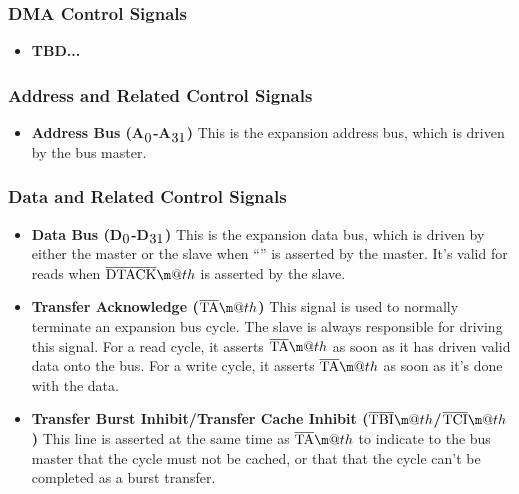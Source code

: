 \documentclass{article}
\makeatletter
\newcommand*{\textoverline}[1]{$\overline{\hbox{#1}}\m@th$}
\newcommand{\textss}[1]{$_{\hbox{#1}}$}
\makeatother
\begin{document}
\subsubsection{DMA Control Signals}

\begin{itemize}
	\item{\textbf{TBD...}}
\end{itemize}

\subsubsection{Address and Related Control Signals}

\begin{itemize}

	\item{\textbf{Address Bus (A\textss{0}-A\textss{31})}} This is the
	expansion address bus, which is driven by the bus master.

\end{itemize}

\subsubsection{Data and Related Control Signals}

\begin{itemize}
	\item{\textbf{Data Bus (D\textss{0}-D\textss{31})}} This is the
	expansion data bus, which is driven by either the master or the slave
	when ``'' is asserted by the master. It's valid for reads when
	\textoverline{DTACK} is asserted by the slave.

	\item{\textbf{Transfer Acknowledge (\textoverline{TA})}} This
	signal is used to normally terminate an expansion bus cycle. The slave
	is always responsible for driving this signal. For a read cycle, it
	asserts \textoverline{TA} as soon as it has driven valid data onto
	the bus. For a write cycle, it asserts \textoverline{TA} as soon as
	it's done with the data.

\item{\textbf{Transfer Burst Inhibit/Transfer Cache Inhibit (\textoverline{TBI}/\textoverline{TCI})}}
	This line is asserted at the same time as \textoverline{TA} to indicate
	to the bus master that the cycle must not be cached, or that that the
	cycle can't be completed as a burst transfer.
\end{itemize}
\end{document}
